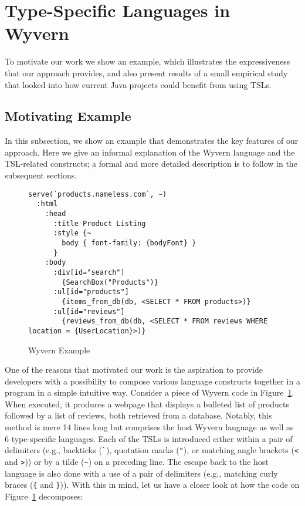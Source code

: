 
\section{Type-Specific Languages in Wyvern}
\label{s:motivation}

To motivate our work we show an example, which illustrates the expressiveness that our approach provides, and also present results of a small empirical study that looked into how current Java projects could  benefit from using TSLs.

\subsection{Motivating Example}

In this subsection, we show an example that demonstrates the key features of our approach. Here we give an informal explanation of the Wyvern language and the TSL-related constructs; a formal and more detailed description is to follow in the subsequent sections.


\begin{figure}
\begin{lstlisting}
serve(`products.nameless.com`, ~)
  :html
    :head
      :title Product Listing
      :style {~
        body { font-family: {bodyFont} }
      }
    :body
      :div[id="search"]
        {SearchBox("Products")}
      :ul[id="products"]
        {items_from_db(db, <SELECT * FROM products>)}
      :ul[id="reviews"]
        {reviews_from_db(db, <SELECT * FROM reviews WHERE location = {UserLocation}>)}
\end{lstlisting}
\caption{Wyvern Example}
\label{f-example}
\end{figure}


One of the reasons that motivated our work is the aspiration to provide developers with a possibility to compose various language constructs together in a program in a simple intuitive way. Consider a piece of Wyvern code in Figure~\ref{f-example}. When executed, it produces a webpage that displays a bulleted list of products followed by a list of reviews, both retrieved from a database. Notably, this method is mere 14 lines long but comprises the host Wyvern language as well as 6 type-specific languages. Each of the TSLs is introduced either within a pair of delimiters (e.g., backticks (\lstinline{`}), quotation marks (\lstinline{"}), or matching angle brackets (\lstinline{<} and \lstinline{>})) or by a tilde (\lstinline{~}) on a preceding line. The escape back to the host language is also done with a use of a pair of delimiters (e.g., matching curly braces (\lstinline|{| and \lstinline|}|)). With this in mind, let us have a closer look at how the code on Figure~\ref{f-example} decomposes:

